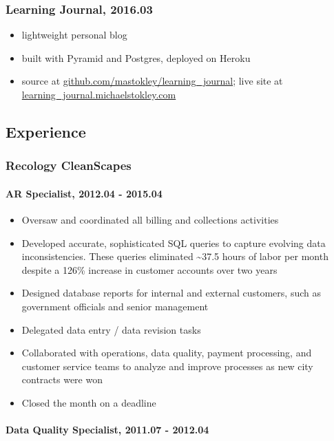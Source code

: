 \documentclass[a4paper, 10pt, oneside, hidelinks]{article}
\begin{document}
\subsubsection*{Learning Journal, 2016.03}
\label{sec:orgheadline11}
\begin{itemize}
\item lightweight personal blog
\item built with Pyramid and Postgres, deployed on Heroku
\item source at \href{http://github.com/mastokley/learning_journal}{github.com/mastokley/learning\_journal}; live site at \href{http://learning_journal.michaelstokley.com}{learning\_journal.michaelstokley.com}
\end{itemize}
\subsection*{Experience}
\label{sec:orgheadline18}
\subsubsection*{Recology CleanScapes}
\label{sec:orgheadline15}
\paragraph*{AR Specialist, 2012.04 - 2015.04}
\label{sec:orgheadline13}
\begin{itemize}
\item Oversaw and coordinated all billing and collections activities
\item Developed accurate, sophisticated SQL queries to capture evolving data inconsistencies. These queries eliminated \textasciitilde{}37.5 hours of labor per month despite a 126\% increase in customer accounts over two years
\item Designed database reports for internal and external customers, such as government officials and senior management
\item Delegated data entry / data revision tasks
\item Collaborated with operations, data quality, payment processing, and customer service teams to analyze and improve processes as new city contracts were won
\item Closed the month on a deadline
\end{itemize}
\paragraph*{Data Quality Specialist, 2011.07 - 2012.04}
\label{sec:orgheadline14}
\end{document}
